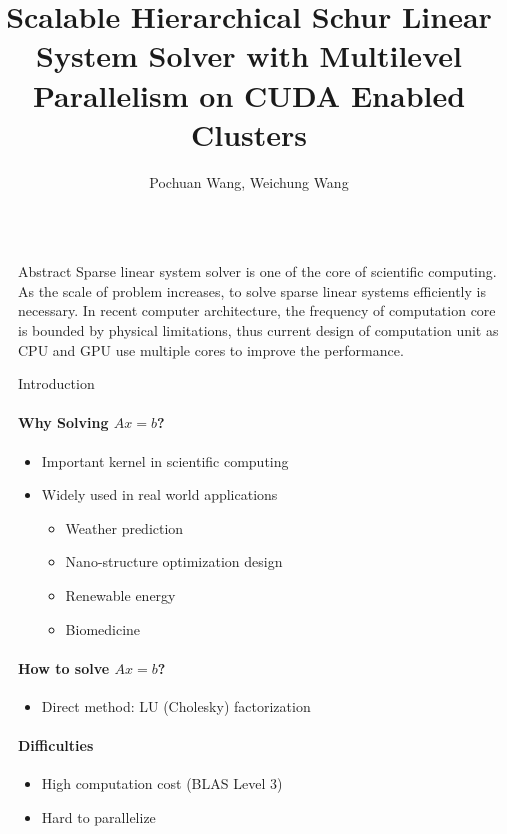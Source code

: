 \documentclass[final]{beamer}
\title{Scalable Hierarchical Schur Linear System Solver with Multilevel Parallelism on CUDA Enabled Clusters}
\author{Pochuan Wang, Weichung Wang}
\institute{Institute of Applied Mathematical Sciences, National Taiwan University}
\newlength{\sepwid}
\newlength{\onecolwid}
\begin{document}
  \begin{frame}[t]
    \begin{columns}[t]
      \begin{column}{\sepwid}\end{column}
        \begin{column}{\onecolwid}
        \begin{block}{Abstract}
          Sparse linear system solver is one of the core of scientific computing.
          As the scale of problem increases, to solve sparse linear systems efficiently
          is necessary.
          In recent computer architecture, the frequency of computation core is bounded
          by physical limitations, thus current design of computation unit as CPU and 
          GPU use multiple cores to improve the performance.
        \end{block}
        \begin{block}{Introduction}
          \paragraph{\textbf{Why Solving $Ax=b$?}}
          \begin{itemize}
            \item Important kernel in scientific computing
            \item Widely used in real world applications
            \begin{itemize}
              \item Weather prediction
              \item Nano-structure optimization design 
              \item Renewable energy
              \item Biomedicine
            \end{itemize}
          \end{itemize}
          \paragraph{\textbf{How to solve $Ax=b$?}}
          \begin{itemize}
            \item Direct method: LU (Cholesky) factorization
          \end{itemize}
          \paragraph{\textbf{Difficulties}}
          \begin{itemize}
            \item High computation cost (BLAS Level 3)
            \item Hard to parallelize
          \end{itemize}

\end{block}
\end{column}
\end{columns}
\end{frame}
\end{document}
